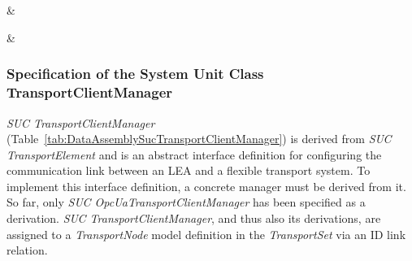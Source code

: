 \begin{footnotesize}
\begin{longtable}
		\\ \hline
	
		\\ \hline
	
		     & 
		\\ \hline
	
		     & 
		\\ \hline
	
	\end{longtable}
\end{footnotesize}

\subsubsection{Specification of the System Unit Class TransportClientManager}

\emph{SUC TransportClientManager} (Table~\ref{tab:DataAssemblySucTransportClientManager}) is derived from \emph{SUC TransportElement} and is an abstract interface definition for configuring the communication link between an LEA and a flexible transport system. To implement this interface definition, a concrete manager must be derived from it. So far, only \emph{SUC OpcUaTransportClientManager} has been specified as a derivation. \emph{SUC TransportClientManager}, and thus also its derivations, are assigned to a \emph{TransportNode} model definition in the \emph{TransportSet} via an ID link relation.

